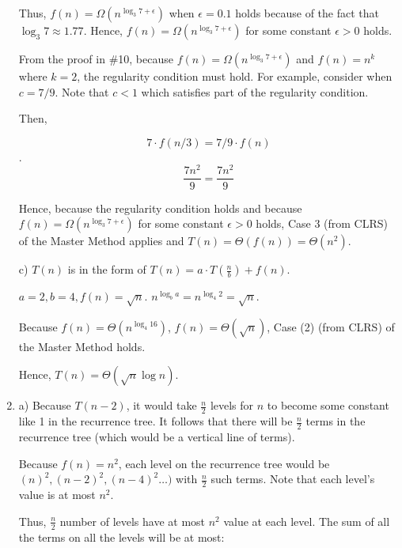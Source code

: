 \documentclass[a4paper]{report}
\begin{document}
\begin{enumerate}
      Thus, $f(n) = \Omega(n^{\log_3 7 + \epsilon})$ when $\epsilon=0.1$ holds because of the fact that
      $\log_3 7 \approx 1.77$. Hence, $f(n) = \Omega(n^{\log_3 7 + \epsilon})$ for some constant $\epsilon>0$ holds.

      From the proof in \#10, because $f(n) = \Omega(n^{\log_3 7 + \epsilon})$ and $f(n) = n^k$ where $k=2$,
      the regularity condition must hold. For example, consider when $c = 7/9$. Note that $c < 1$ which satisfies part of the
      regularity condition. 
      
      Then,
      
      $$7 \cdot f(n/3) = 7/9 \cdot f(n)$$.
      $$\frac{7 n^2}{9}= \frac{7 n^2}{9}$$ 

      Hence, because the regularity condition holds and because $f(n) = \Omega(n^{\log_3 7 + \epsilon})$ for some constant $\epsilon>0$ holds,
      Case 3 (from CLRS) of the Master Method applies and $T(n) = \Theta(f(n)) = \Theta(n^2)$.


      \bigskip
      c) 
      $T(n)$ is in the form of $T(n) = a \cdot T(\frac{n}{b}) + f(n)$.
      
      $a = 2, b = 4, f(n) = \sqrt{n}$. $n^{\log_b a} = n^{\log_4 2} = \sqrt{n}$. 

      Because $f(n) = \Theta(n^{\log_4 16})$, $f(n) = \Theta(\sqrt{n})$, Case (2) (from CLRS) of the Master Method holds. 

      Hence, $T(n) = \Theta(\sqrt{n} \log n)$. 

    \par
    \bigskip

    \item

      a) Because $T(n-2)$, it would take $\frac{n}{2}$ levels for $n$ to become some constant like 1 in the recurrence tree. 
      It follows that there will be $\frac{n}{2}$ terms in the recurrence tree (which would be a vertical line of terms). 

      Because $f(n) = n^2$, each level on the recurrence tree would be $(n)^2, (n-2)^2, (n-4)^2\dots)$ with $\frac{n}{2}$ such terms.
      Note that each level's value is at most $n^2$. 

      Thus, $\frac{n}{2}$ number of levels have at most $n^2$ value at each level. 
      The sum of all the terms on all the levels will be at most:


\end{enumerate}
\end{document}
